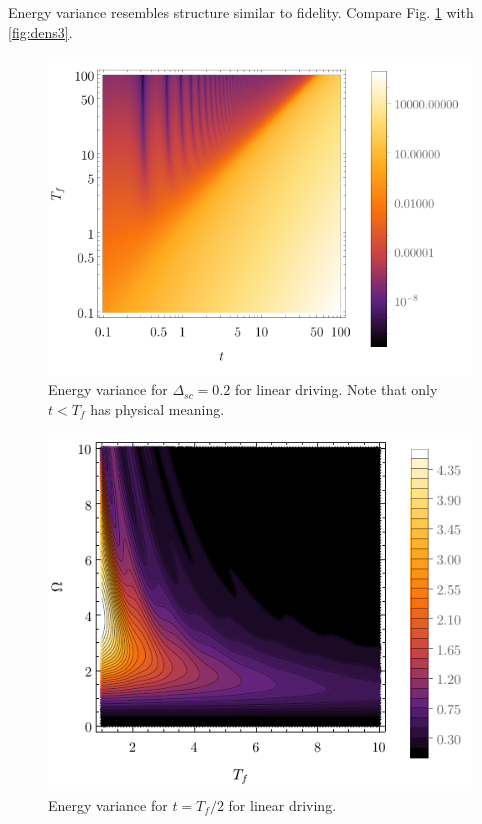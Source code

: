 \subsection{}
Energy variance resembles structure similar to fidelity. Compare Fig. \ref{fig:densVariance} with \ref{fig:dens3}. 
\begin{figure}[H]
    \centering
    \includegraphics[scale=1.2]{../img/densVariance.pdf}
    \caption{Energy variance for $\Delta_{sc}=0.2$ for linear driving. Note that only $t<T_f$ has physical meaning.}
    \label{fig:densVariance}
\end{figure}

\begin{figure}[H]
    \centering
    \includegraphics[scale=1.2]{../img/contVariance.pdf}
    \caption{Energy variance for $t=T_f/2$ for linear driving.}
    \label{fig:densVarLin}
\end{figure}

















